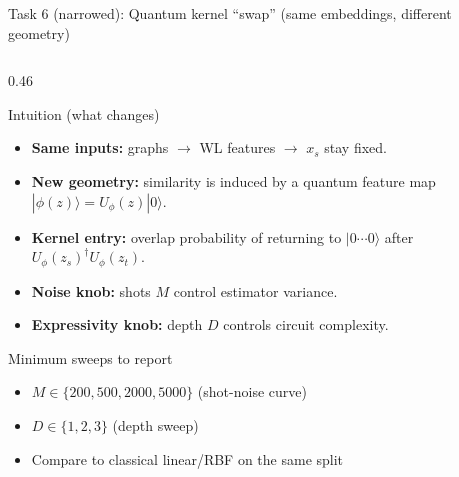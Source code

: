 \documentclass[aspectratio=169,xcolor={dvipsnames}]{beamer}
\renewcommand{\accent}[1]{\textbf{#1}}
\begin{document}
\begin{frame}[shrink=40]{Task 6 (narrowed): Quantum kernel “swap” (same embeddings, different geometry)}
\begin{columns}[T,onlytextwidth]
\begin{column}{0.46\textwidth}
\begin{block}{Intuition (what changes)}
\begin{itemize}\setlength\itemsep{4pt}
\item \accent{Same inputs:} graphs $\to$ WL features $\to$ $x_s$ stay fixed.
\item \accent{New geometry:} similarity is induced by a quantum feature map
$|\phi(z)\rangle=U_\phi(z)|0\rangle$.
\item \accent{Kernel entry:} overlap probability of returning to $|0\cdots0\rangle$ after
$U_\phi(z_s)^\dagger U_\phi(z_t)$.
\item \accent{Noise knob:} shots $M$ control estimator variance.
\item \accent{Expressivity knob:} depth $D$ controls circuit complexity.
\end{itemize}
\end{block}

\vspace{1mm}
\begin{block}{Minimum sweeps to report}
\begin{itemize}\setlength\itemsep{2pt}
\item $M\in\{200,500,2000,5000\}$ (shot-noise curve)
\item $D\in\{1,2,3\}$ (depth sweep)
\item Compare to classical linear/RBF on the same split
\end{itemize}
\end{block}
\end{column}

\end{columns}
\end{frame}
\end{document}
